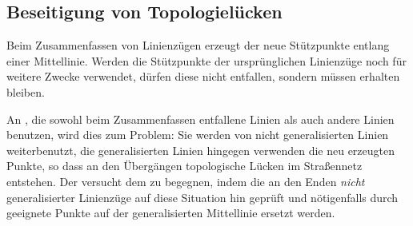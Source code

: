 \documentclass[../main/thesis.tex]{subfiles}
\begin{document}
\subsection{Beseitigung von Topologielücken}
\label{ch:relocateGeneralisedNodes}

Beim Zusammenfassen von Linienzügen erzeugt der  neue Stützpunkte entlang einer Mittellinie.
Werden die Stützpunkte der ursprünglichen Linienzüge noch für weitere Zwecke verwendet, dürfen diese nicht entfallen, sondern müssen erhalten bleiben.

An , die sowohl beim Zusammenfassen entfallene Linien als auch andere Linien benutzen, wird dies zum Problem:
Sie werden von nicht generalisierten Linien weiterbenutzt, die generalisierten Linien hingegen verwenden die neu erzeugten Punkte, so dass an den Übergängen topologische Lücken im Straßennetz entstehen.
Der  versucht dem zu begegnen, indem die  an den Enden \emph{nicht} generalisierter Linienzüge auf diese Situation hin geprüft und nötigenfalls durch geeignete Punkte auf der generalisierten Mittellinie ersetzt werden.

\end{document}
